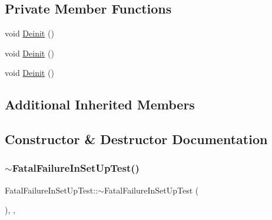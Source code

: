 \subsection*{Private Member Functions}
\begin{DoxyCompactItemize}
\item 
void \mbox{\hyperlink{class_fatal_failure_in_set_up_test_a15b9ce9af7b34582b95871af4f8a97a4}{Deinit}} ()
\item 
void \mbox{\hyperlink{class_fatal_failure_in_set_up_test_a15b9ce9af7b34582b95871af4f8a97a4}{Deinit}} ()
\item 
void \mbox{\hyperlink{class_fatal_failure_in_set_up_test_a15b9ce9af7b34582b95871af4f8a97a4}{Deinit}} ()
\end{DoxyCompactItemize}
\subsection*{Additional Inherited Members}


\subsection{Constructor \& Destructor Documentation}
\mbox{\label{class_fatal_failure_in_set_up_test_af626d6417897e3351d62f3a04a74e245}} 
\subsubsection{\texorpdfstring{$\sim$FatalFailureInSetUpTest()}{~FatalFailureInSetUpTest()}\hspace{0.1cm}{\footnotesize\ttfamily [1/3]}}
{\footnotesize\ttfamily Fatal\+Failure\+In\+Set\+Up\+Test\+::$\sim$\+Fatal\+Failure\+In\+Set\+Up\+Test (\begin{DoxyParamCaption}{ }\end{DoxyParamCaption})\hspace{0.3cm}{\ttfamily [inline]}, {\ttfamily [override]}, {\ttfamily [protected]}}

\mbox{\label{class_fatal_failure_in_set_up_test_af626d6417897e3351d62f3a04a74e245}} 
